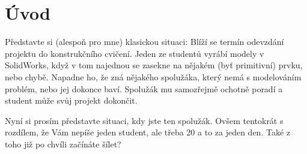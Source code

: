 \chapter*{Úvod}
Představte si (alespoň pro mne) klasickou situaci: 
Blíží se termín odevzdání projektu do konstrukčního cvičení.
Jeden ze studentů vyrábí modely v SolidWorks, když v tom najednou se zasekne na nějakém (byť primitivní) prvku, nebo chybě.
Napadne ho, že zná nějakého spolužáka, který nemá s modelováním problém, nebo jej dokonce baví.
Spolužák mu samozřejmě ochotně poradí a student může svůj projekt dokončit.

Nyní si prosím představte situaci, kdy jste ten spolužák.
Ovšem tentokrát s rozdílem, že Vám nepíše jeden student, ale třeba 20 a to za jeden den.
Také z toho již po chvíli začínáte šílet?

\newpage
